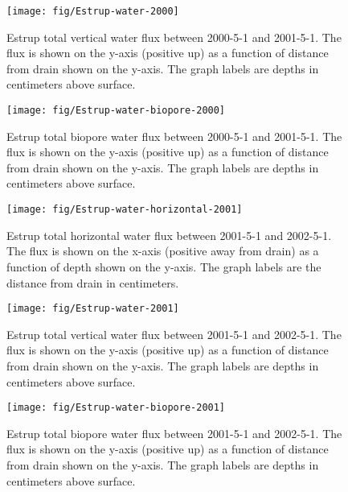 \documentclass[a4paper]{article}
\begin{document}
\begin{figure}[htbp]
  \centering
  \texttt{[image: fig/Estrup-water-2000]}
  
  \caption{Estrup total vertical water flux between 2000-5-1 and
    2001-5-1.  The flux is shown on the y-axis (positive up) as a
    function of distance from drain shown on the y-axis.  The graph
    labels are depths in centimeters above surface.}
  \label{fig:Estrup-water-2000}
\end{figure}\FloatBarrier

\begin{figure}[htbp]
  \centering
  \texttt{[image: fig/Estrup-water-biopore-2000]}
  
  \caption{Estrup total biopore water flux between 2000-5-1 and
    2001-5-1.  The flux is shown on the y-axis (positive up) as a
    function of distance from drain shown on the y-axis.  The graph
    labels are depths in centimeters above surface.}
  \label{fig:Estrup-water-biopore-2000}
\end{figure}\FloatBarrier

\begin{figure}[htbp]
  \centering
  \texttt{[image: fig/Estrup-water-horizontal-2001]}
  
  \caption{Estrup total horizontal water flux between 2001-5-1 and
    2002-5-1.  The flux is shown on the x-axis (positive away from
    drain) as a function of depth shown on the y-axis.  The graph
    labels are the distance from drain in centimeters.}
  \label{fig:Estrup-water-2001-horizontal}
\end{figure}\FloatBarrier

\begin{figure}[htbp]
  \centering
  \texttt{[image: fig/Estrup-water-2001]}
  
  \caption{Estrup total vertical water flux between 2001-5-1 and
    2002-5-1.  The flux is shown on the y-axis (positive up) as a
    function of distance from drain shown on the y-axis.  The graph
    labels are depths in centimeters above surface.}
  \label{fig:Estrup-water-2001}
\end{figure}\FloatBarrier

\begin{figure}[htbp]
  \centering
  \texttt{[image: fig/Estrup-water-biopore-2001]}
  
  \caption{Estrup total biopore water flux between 2001-5-1 and
    2002-5-1.  The flux is shown on the y-axis (positive up) as a
    function of distance from drain shown on the y-axis.  The graph
    labels are depths in centimeters above surface.}
  \label{fig:Estrup-water-biopore-2001}
\end{figure}\FloatBarrier
\end{document}
